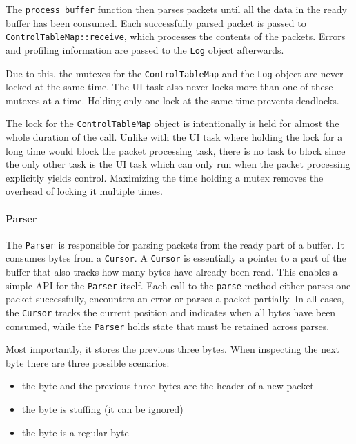 The \lstinline{process_buffer} function then parses packets until all the data in the ready buffer
has been consumed. Each successfully parsed packet is passed to \lstinline{ControlTableMap::receive},
which processes the contents of the packets. Errors and profiling information are passed to the
\lstinline{Log} object afterwards.

Due to this, the mutexes for the \lstinline{ControlTableMap} and the \lstinline{Log} object are
never locked at the same time. The UI task also never locks more than one of these mutexes at a time.
Holding only one lock at the same time prevents deadlocks.

The lock for the \lstinline{ControlTableMap} object is intentionally is held for almost the whole
duration of the call. Unlike with the UI task where holding the lock for a long time would block
the packet processing task, there is no task to block since the only other task is the UI task which
can only run when the packet processing explicitly yields control. Maximizing the time holding a
mutex removes the overhead of locking it multiple times.

\paragraph{Parser}

The \lstinline{Parser} is responsible for parsing packets from the ready part of a buffer. It
consumes bytes from a \mbox{\lstinline{Cursor}.} A \lstinline{Cursor} is essentially a pointer to
a part of the buffer that also tracks how many bytes have already been read. This enables a simple
API for the \lstinline{Parser} itself. Each call to the \lstinline{parse} method either parses one
packet successfully, encounters an error or parses a packet partially. In all cases, the \lstinline{Cursor}
tracks the current position and indicates when all bytes have been consumed, while the \lstinline{Parser}
holds state that must be retained across parses.

Most importantly, it stores the previous three bytes. When inspecting the next byte there are three
possible scenarios:

\begin{itemize}
    \item the byte and the previous three bytes are the header of a new packet
    \item the byte is stuffing (it can be ignored)
    \item the byte is a regular byte
\end{itemize}

